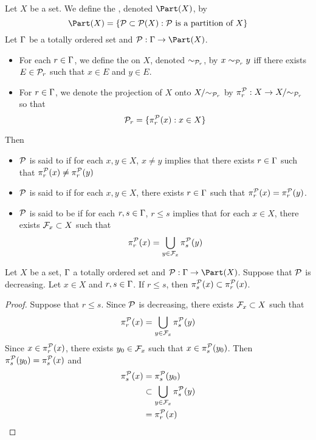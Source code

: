 \documentclass{book}
\begin{document}
\begin{defn}
	Let $X$ be a set. We define the , denoted $\Part(X)$, by 
	$$\Part(X) = \{\MP \subset \MP(X): \MP \text{ is a partition of $X$}\}$$ 
	Let $\Gamma$ be a totally ordered set and $\MP: \Gam \rightarrow \Part(X)$. 
	\begin{itemize}
		\item For each $r \in \Gamma$, we define the  on $X$, denoted $\sim_{\mathcal{P}_r}$, by $x \sim_{\mathcal{P}_r} y$ iff there exists $E \in \mathcal{P}_r$ such that $x \in E$ and $y \in E$.
		\item For $r \in \Gamma$, we denote the projection of $X$ onto $X/{\sim_{\mathcal{P}_r}}$ by $\pi^{\mathcal{P}}_r: X \rightarrow X/ {\sim_{\mathcal{P}_r}}$ so that 
		$$\mathcal{P}_r = \{\pi^{\mathcal{P}}_r(x): x \in X\}$$ 
	\end{itemize}
	Then 
	\begin{itemize}
		\item $\mathcal{P}$ is said to  if for each $x,y \in X$, $x \neq y$ implies that there exists $r \in \Gamma$ such that $\pi^{\mathcal{P}}_r(x) \neq \pi^{\mathcal{P}}_r(y)$
		\item $\mathcal{P}$ is said to  if for each $x,y \in X$, there exists $r \in \Gamma$ such that $\pi^{\mathcal{P}}_{r}(x) = \pi^{\mathcal{P}}_{r}(y)$.
		\item $\mathcal{P}$ is said to be 
		 if for each $r,s \in \Gamma$, $r \leq s$ implies that for each $x \in X$, there exists $\mathcal{F}_x \subset X$ such that 
		$$\pi^{\mathcal{P}}_r(x) = \bigcup\limits_{y \in \mathcal{F}_x} \pi^{\mathcal{P}}_s(y)$$
	\end{itemize}
\end{defn}

\begin{ex}
	Let $X$ be a set, $\Gamma$ a totally ordered set and $\MP: \Gam \rightarrow \Part(X)$. Suppose that $\mathcal{P}$ is decreasing. Let $x\in X$ and $r, s \in \Gamma$. If $r \leq s$, then $\pi^{\mathcal{P}}_s(x) \subset \pi^{\mathcal{P}}_r(x)$.
\end{ex}

\begin{proof}
	Suppose that $r \leq s$. Since $\mathcal{P}$ is decreasing, there exists $\mathcal{F}_x \subset X$ such that 
	$$\pi^{\mathcal{P}}_r(x) = \bigcup\limits_{y \in \mathcal{F}_x} \pi^{\mathcal{P}}_s(y)$$ 
	Since $x \in \pi^{\mathcal{P}}_r(x)$, there exists $y_0 \in \mathcal{F}_x$ such that $x \in \pi^{\mathcal{P}}_s(y_0)$. Then $\pi^{\mathcal{P}}_s(y_0) = \pi^{\mathcal{P}}_s(x)$ and 
	\begin{align*}
		\pi^{\mathcal{P}}_s(x)
		& = \pi^{\mathcal{P}}_s(y_0) \\
		& \subset \bigcup\limits_{y \in \mathcal{F}_x} \pi^{\mathcal{P}}_s(y) \\
		& = \pi^{\mathcal{P}}_r(x)
	\end{align*}
\end{proof}
\end{document}
